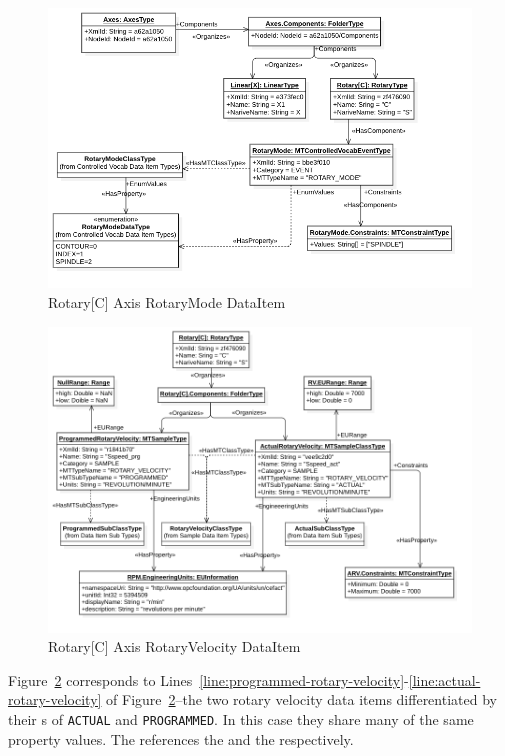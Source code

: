 \begin{figure}[ht]
    \centering
    \includegraphics[width=1.0\textwidth]{diagrams/mtconnect-mapping/rotary-c-rotary-mode.png}
    \caption{Rotary[C] Axis RotaryMode DataItem}
    \label{fig:rotary-c-rotary-mode}
\end{figure}

\FloatBarrier

\begin{figure}[ht]
    \centering
    \includegraphics[width=1.0\textwidth]{diagrams/mtconnect-mapping/rotary-c-rotary-velocity.png}
    \caption{Rotary[C] Axis RotaryVelocity DataItem}
    \label{fig:rotary-c-rotary-velocity}
\end{figure}

Figure~\ref{fig:rotary-c-rotary-velocity} corresponds to Lines~\ref{line:programmed-rotary-velocity}-\ref{line:actual-rotary-velocity} of Figure~\ref{fig:rotary-c-rotary-velocity}--the two rotary velocity data items differentiated by their s of \texttt{ACTUAL} and \texttt{PROGRAMMED}. In this case they share many of the same property values. The  references the  and the  respectively.

